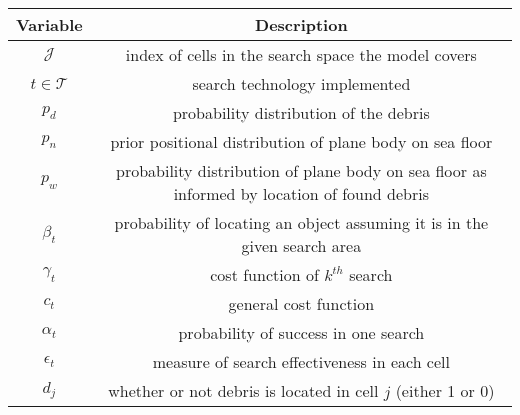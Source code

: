 \begin{tabular}{|c|c|}
\hline
\rule{0pt}{2.5ex} \textbf{Variable} & \textbf{Description}\\
\hline\hline
\rule{0pt}{2.5ex} $\mathcal{J}$ & index of cells in the search space the model covers\\\hline
\rule{0pt}{2.5ex} $t\in\mathcal{T}$ & search technology implemented\\\hline
\rule{0pt}{2.5ex} $p_d$ & probability distribution of the debris\\\hline
\rule{0pt}{2.5ex} $p_n$ & prior positional distribution of plane body on sea floor \\\hline
\rule{0pt}{2.5ex} $p_w$ & probability distribution of plane body on sea floor as informed by location of found debris\\\hline
\rule{0pt}{2.5ex} $\beta_t$ & probability of locating an object assuming it is in the given search area\\\hline
\rule{0pt}{2.5ex} $\gamma_t$ & cost function of $k^{th}$ search\\\hline
\rule{0pt}{2.5ex} $c_t$ & general cost function\\\hline
\rule{0pt}{2.5ex} $\alpha_t$ & probability of success in one search \\\hline
\rule{0pt}{2.5ex} $\epsilon_t$ & measure of search effectiveness in each cell\\\hline
\rule{0pt}{2.5ex} $d_j$ & whether or not debris is located in cell $j$ (either 1 or 0)\\\hline
\end{tabular}

